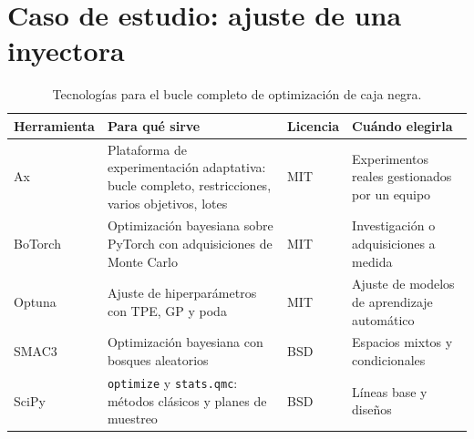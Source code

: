 \section{Caso de estudio: ajuste de una inyectora}

\addtocounter{definicion}{1}%

\begin{table}[ht]
\centering\small
\begin{tabularx}{\textwidth}{@{}>{\raggedright\arraybackslash}p{2.6cm}>{\raggedright\arraybackslash}X>{\raggedright\arraybackslash}p{2.1cm}>{\raggedright\arraybackslash}p{3.6cm}@{}}
\toprule
Herramienta & Para qué sirve & Licencia & Cuándo elegirla \\
\midrule
Ax~\cite{ax} & Plataforma de experimentación adaptativa: bucle completo, restricciones, varios objetivos, lotes & MIT & Experimentos reales gestionados por un equipo \\
BoTorch~\cite{botorch} & Optimización bayesiana sobre PyTorch con adquisiciones de Monte Carlo & MIT & Investigación o adquisiciones a medida \\
Optuna~\cite{optuna} & Ajuste de hiperparámetros con TPE, GP y poda & MIT & Ajuste de modelos de aprendizaje automático \\
SMAC3~\cite{smac3} & Optimización bayesiana con bosques aleatorios & BSD & Espacios mixtos y condicionales \\
SciPy~\cite{scipyqmc} & \texttt{optimize} y \texttt{stats.qmc}: métodos clásicos y planes de muestreo & BSD & Líneas base y diseños \\
\bottomrule
\end{tabularx}
\caption{Tecnologías para el bucle completo de optimización de caja negra.}
\label{tab:tec1}
\end{table}

\addtocounter{definicion}{1}%

